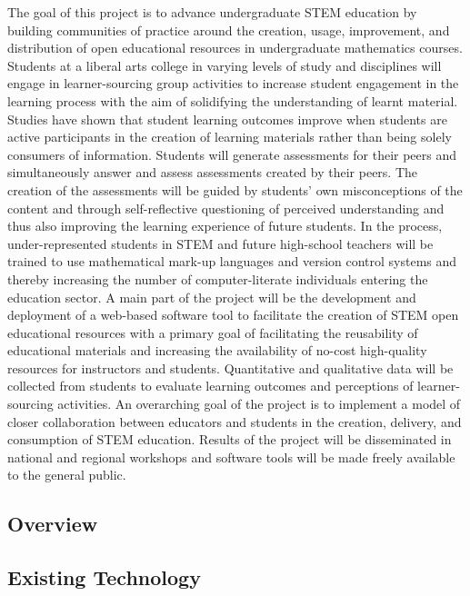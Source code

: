 \documentclass[11pt]{article}
\begin{document}
The goal of this project is to advance undergraduate STEM education by building communities of practice around the creation, usage, improvement, and distribution of open educational resources in undergraduate mathematics courses.  Students at a liberal arts college in varying levels of study and disciplines will engage in learner-sourcing group activities to increase student engagement in the learning process with the aim of solidifying the understanding of learnt material.  Studies have shown that student learning outcomes improve when students are active participants in the creation of learning materials rather than being solely consumers of information.  Students will generate assessments for their peers and simultaneously answer and assess assessments created by their peers. The creation of the assessments will be guided by students' own misconceptions of the content and through self-reflective questioning of perceived understanding and thus also improving the learning experience of future students.  In the process, under-represented students in STEM and future high-school teachers will be trained to use mathematical mark-up languages and version control systems and thereby increasing the number of computer-literate individuals entering the education sector.  A main part of the project will be the development and deployment of a web-based software tool to facilitate the creation of STEM open educational resources with a primary goal of facilitating the reusability of educational materials and increasing the availability of no-cost high-quality resources for instructors and students.  Quantitative and qualitative data will be collected from students to evaluate learning outcomes and perceptions of learner-sourcing activities.  An overarching goal of the project is to implement a model of closer collaboration between educators and students in the creation, delivery, and consumption of STEM education.  Results of the project will be disseminated in national and regional workshops and software tools will be made freely available to the general public.


\subsection{Overview}

\subsection{Existing Technology}
\end{document}
